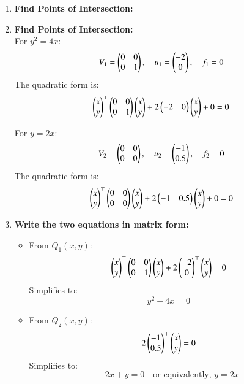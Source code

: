 \documentclass[journal]{IEEEtran}
\begin{document}
\begin{enumerate}
    \item \textbf{Find Points of Intersection:} \\  
\item \textbf{Find Points of Intersection:} \\  
    For \( y^2 = 4x \):
    \[
    V_1 = \begin{pmatrix} 
    0 & 0 \\ 
    0 & 1 
    \end{pmatrix}, \quad 
    u_1 = \begin{pmatrix} 
    -2 \\ 
    0 
    \end{pmatrix}, \quad 
    f_1 = 0
    \]
    The quadratic form is:
    \[
    \begin{pmatrix} 
    x \\ 
    y 
    \end{pmatrix}^\top 
    \begin{pmatrix} 
    0 & 0 \\ 
    0 & 1 
    \end{pmatrix}
    \begin{pmatrix} 
    x \\ 
    y 
    \end{pmatrix}
    + 2 \begin{pmatrix} 
    -2 & 0 
    \end{pmatrix}
    \begin{pmatrix} 
    x \\ 
    y 
    \end{pmatrix}
    + 0 = 0
    \]

    For \( y = 2x \):
    \[
    V_2 = \begin{pmatrix} 
    0 & 0 \\ 
    0 & 0 
    \end{pmatrix}, \quad 
    u_2 = \begin{pmatrix} 
    -1 \\ 
    0.5 
    \end{pmatrix}, \quad 
    f_2 = 0
    \]
    The quadratic form is:
    \[
    \begin{pmatrix} 
    x \\ 
    y 
    \end{pmatrix}^\top 
    \begin{pmatrix} 
    0 & 0 \\ 
    0 & 0 
    \end{pmatrix}
    \begin{pmatrix} 
    x \\ 
    y 
    \end{pmatrix}
    + 2 \begin{pmatrix} 
    -1 & 0.5 
    \end{pmatrix}
    \begin{pmatrix} 
    x \\ 
    y 
    \end{pmatrix}
    + 0 = 0
    \]

    \item \textbf{Write the two equations in matrix form:}
    \begin{itemize}
        \item From \( Q_1(x, y) \):
        \[
        \begin{pmatrix} 
        x \\ 
        y 
        \end{pmatrix}^\top 
        \begin{pmatrix} 
        0 & 0 \\ 
        0 & 1 
        \end{pmatrix}
        \begin{pmatrix} 
        x \\ 
        y 
        \end{pmatrix}
        + 2 \begin{pmatrix} 
        -2 \\ 
        0 
        \end{pmatrix}^\top 
        \begin{pmatrix} 
        x \\ 
        y 
        \end{pmatrix}
        = 0
        \]
        Simplifies to:
        \[
        y^2 - 4x = 0
        \]

        \item From \( Q_2(x, y) \):
        \[
        2 \begin{pmatrix} 
        -1 \\ 
        0.5 
        \end{pmatrix}^\top 
        \begin{pmatrix} 
        x \\ 
        y 
        \end{pmatrix}
        = 0
        \]
        Simplifies to:
        \[
        -2x + y = 0 \quad \text{or equivalently, } y = 2x
        \]
    \end{itemize}


\end{enumerate}
\end{document}
